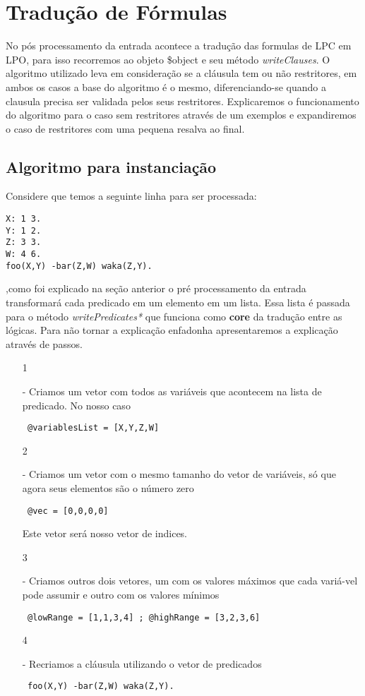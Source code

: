 \documentclass[a4paper]{article}
\begin{document}
\newpage

\section{Tradução de Fórmulas}
No pós processamento da entrada acontece a tradução das formulas de LPC em LPO, para isso recorremos  ao objeto \$object e seu método \textit{writeClauses}. O algoritmo utilizado leva em consideração se a cláusula tem ou não restritores, em ambos os casos a base do algoritmo é o mesmo, diferenciando-se quando a clausula precisa ser validada pelos seus restritores. Explicaremos o funcionamento do algoritmo para o caso sem restritores através de um exemplos e expandiremos o caso de restritores com uma pequena resalva ao final.

\subsection{Algoritmo para instanciação}

Considere que temos a seguinte linha para ser processada:

\begin{verbatim}
X: 1 3.
Y: 1 2.
Z: 3 3.
W: 4 6.
foo(X,Y) -bar(Z,W) waka(Z,Y).
\end{verbatim}

,como foi explicado na seção anterior o pré processamento da entrada transformará cada predicado em um elemento em um lista. Essa lista é passada para o método \textit{writePredicates*} que funciona como \textbf{core} da tradução entre as lógicas. Para não tornar a explicação enfadonha apresentaremos a explicação através de passos.

\begin{itemize}
\item[1]{- Criamos um vetor com todos as variáveis que acontecem na lista de predicado. No nosso caso 
\begin{verbatim} @variablesList = [X,Y,Z,W] \end{verbatim}}
\item[2]{- Criamos um vetor com o mesmo tamanho do vetor de variáveis, só que agora seus elementos são o número zero 
\begin{verbatim} @vec = [0,0,0,0] \end{verbatim}
Este vetor será nosso vetor de indices.}
\item[3]{- Criamos outros dois vetores, um com os valores máximos que cada variá-vel pode assumir e outro com os valores mínimos 
\begin{verbatim} @lowRange = [1,1,3,4] ; @highRange = [3,2,3,6]\end{verbatim}}

\item[4]{- Recriamos a cláusula utilizando o vetor de predicados 
\begin{verbatim} foo(X,Y) -bar(Z,W) waka(Z,Y). \end{verbatim}}
\end{itemize}
\end{document}
